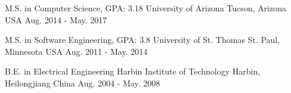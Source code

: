 

\begin{cventries}

  \eduentry
    {M.S. in Computer Science, GPA: 3.18} %
    {University of Arizona} %
    {Tucson, Arizona USA} %
    {Aug. 2014 - May. 2017} %

  \eduentry
    {M.S. in Software Engineering, GPA: 3.8} %
    {University of St. Thomas} %
    {St. Paul, Minnesota USA} %
    {Aug. 2011 - May. 2014} %

  \eduentry
    {B.E. in Electrical Engineering} %
    {Harbin Institute of Technology} %
    {Harbin, Heilongjiang China} %
    {Aug. 2004 - May. 2008} %

\end{cventries}
